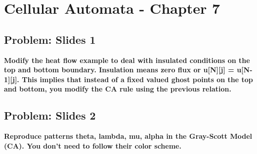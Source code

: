 
\chapter{Cellular Automata - Chapter 7}

\section{Problem: Slides 1}
\textbf{ Modify the heat flow example to deal with insulated conditions on the top and bottom boundary. Insulation means zero flux or u[N][j] = u[N-1][j]. This implies that instead of a fixed valued ghost points on the top and bottom, you modify the CA rule using the previous relation. }


\section{Problem: Slides 2}
\textbf{ Reproduce patterns theta, lambda, mu, alpha in the Gray-Scott Model (CA). You don't need to follow their color scheme. }
